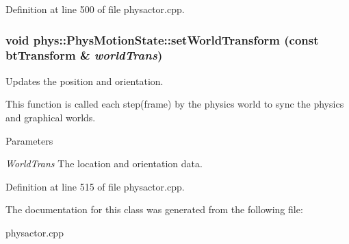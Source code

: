 Definition at line 500 of file physactor.cpp.

\hypertarget{classphys_1_1PhysMotionState_a91e372f8f474bb570e502ee42ec2deeb}{
\subsubsection[{setWorldTransform}]{\setlength{\rightskip}{0pt plus 5cm}void phys::PhysMotionState::setWorldTransform (const btTransform \& {\em worldTrans})}}
\label{dc/d0d/classphys_1_1PhysMotionState_a91e372f8f474bb570e502ee42ec2deeb}


Updates the position and orientation. 

This function is called each step(frame) by the physics world to sync the physics and graphical worlds. 
\begin{DoxyParams}{Parameters}
\item[{\em WorldTrans}]The location and orientation data. \end{DoxyParams}


Definition at line 515 of file physactor.cpp.



The documentation for this class was generated from the following file:\begin{DoxyCompactItemize}
\item 
physactor.cpp\end{DoxyCompactItemize}
